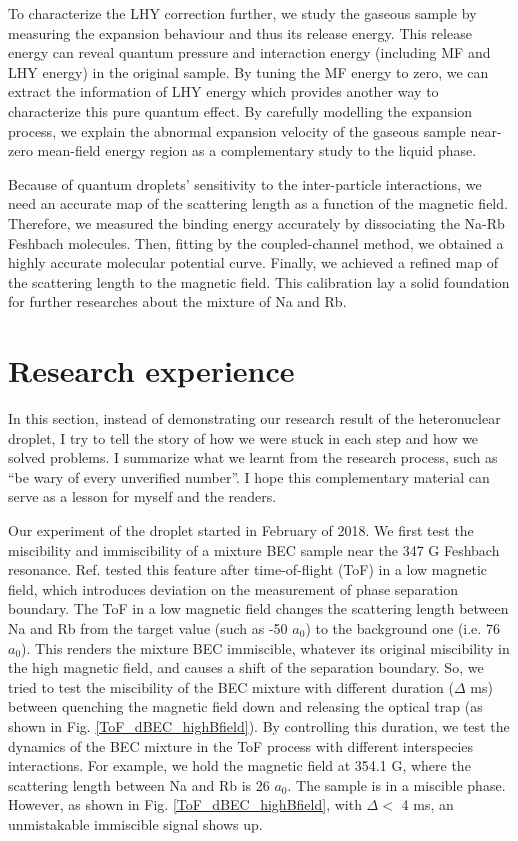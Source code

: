 To characterize the LHY correction further, we study the gaseous sample by measuring the expansion behaviour and thus its release energy. This release energy can reveal quantum pressure and interaction energy (including MF and LHY energy) in the original sample. By tuning the MF energy to zero, we can extract the information of LHY energy which provides another way to characterize this pure quantum effect. By carefully modelling the expansion process, we explain the abnormal expansion velocity of the gaseous sample near-zero mean-field energy region as a complementary study to the liquid phase.

Because of quantum droplets' sensitivity to the inter-particle interactions, we need an accurate map of the scattering length as a function of the magnetic field. Therefore, we measured the binding energy accurately by dissociating the Na-Rb Feshbach molecules. Then, fitting by the coupled-channel method, we obtained a highly accurate molecular potential curve. Finally, we achieved a refined map of the scattering length to the magnetic field. This calibration lay a solid foundation for further researches about the mixture of Na and Rb.

\section{Research experience}
\label{sec:intro-overview}
In this section, instead of demonstrating our research result of the heteronuclear droplet, I try to tell the story of how we were stuck in each step and how we solved problems. I summarize what we learnt from the research process, such as ``be wary of every unverified number''. I hope this complementary material can serve as a lesson for myself and the readers.

Our experiment of the droplet started in February of 2018. We first test the miscibility and immiscibility of a mixture BEC sample near the 347 G Feshbach resonance. Ref. \cite{wang2015double} tested this feature after time-of-flight (ToF) in a low magnetic field, which introduces deviation on the measurement of phase separation boundary. The ToF in a low magnetic field changes the scattering length between Na and Rb from the target value (such as -50 \(a_0\)) to the background one (i.e. 76 \(a_0\)). This renders the mixture BEC immiscible, whatever its original miscibility in the high magnetic field, and causes a shift of the separation boundary. So, we tried to test the miscibility of the BEC mixture with different duration (\(\Delta\) ms) between quenching the magnetic field down and releasing the optical trap (as shown in Fig. \ref{ToF_dBEC_highBfield}). By controlling this duration, we test the dynamics of the BEC mixture in the ToF process with different interspecies interactions. For example, we hold the magnetic field at 354.1 G, where the scattering length between Na and Rb is 26 \(a_0\). The sample is in a miscible phase. However, as shown in Fig. \ref{ToF_dBEC_highBfield}, with \(\Delta<\) 4 ms, an unmistakable immiscible signal shows up.

